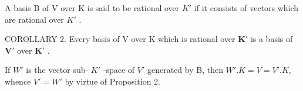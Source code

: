 A basis B of V over K is said to be rational over \(K'\) if it consists of vectors which are rational over \(K'\) .

COROLLARY 2. Every basis of V over K which is rational over \(\mathbf{K}'\) is a basis of \(\mathbf{V}'\) over \(\mathbf{K}'\) .

If \(W'\) is the vector sub- \(K'\) -space of \(V'\) generated by B, then \(W'. K = V = V'. K\), whence \(V' = W'\) by virtue of Proposition 2.

